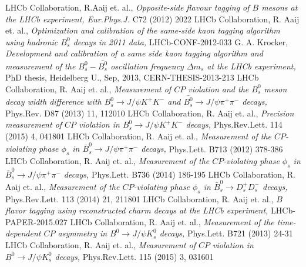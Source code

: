 \documentclass{PoS}
\begin{document}
\begingroup
{}
\begin{thebibliography}{99}
\small{}LHCb Collaboration, R.Aaij et. al., {\it Opposite-side flavour tagging of $B$ mesons at the LHCb experiment, Eur.Phys.J.} C72 (2012) 2022
\small{}LHCb Collaboration, R. Aaij et. al., {\it Optimization and calibration of the same-side kaon \mbox{tagging} algorithm using hadronic $B_s^0$ decays in 2011 data,} LHCb-CONF-2012-033
\small{} G. A. Krocker, {\it Development and calibration of a same side kaon tagging algorithm and measurement of the $B_s^0-\bar{B_s^0}$ oscillation frequency $\Delta m_s$ at the LHCb experiment, } PhD thesis, Heidelberg U., Sep, 2013, CERN-THESIS-2013-213
\small{}LHCb Collaboration, R. Aaij et. al., {\it Measurement of $C\!P$ violation and the $B_s^0$ meson decay width difference with   $B_s^0\to J\!/\!\psi K^+K^-$ and \mbox{$\bar{B_s^0}\to J\!/\!\psi \pi^+\pi^-$} decays, } Phys.Rev. D87 (2013) 11, 112010
\small{}LHCb Collaboration, R. Aaij et. al., {\it Precision measurement of $C\!P$ violation in $B_s^0\to J\!/\!\psi K^+K^-$ decays, } Phys.Rev.Lett. 114 (2015) 4, 041801
\small{} LHCb Collaboration, R. Aaij et. al., {\it Measurement of the $C\!P$-violating phase $\phi_s$ in $\bar{B}_s^0\to J\!/\!\psi \pi^+\pi^-$ decays, } Phys.Lett. B713 (2012) 378-386
\small{} LHCb Collaboration, R. Aaij et. al., {\it Measurement of the $C\!P$-violating phase $\phi_s$ in $\bar{B}_s^0\to J\!/\!\psi \pi^+\pi^-$ decays, } Phys.Lett. B736 (2014) 186-195
\small{} LHCb Collaboration, R. Aaij et. al., {\it Measurement of the $C\!P$-violating phase $\phi_s$ in $\bar{B}_s^0\to D_s^+D_s^-$ decays, } Phys.Rev.Lett. 113 (2014) 21, 211801
\small{} LHCb Collaboration, R. Aaij et. al., {\it $B$ flavor tagging using reconstructed charm decays at the LHCb experiment, } LHCb-PAPER-2015.027
 LHCb Collaboration, R. Aaij et. al., {\it Measurement of the time-dependent $C\!P$ asymmetry in $B^0\to J\!/\!\psi K_s^0$ decays, } Phys.Lett. B721 (2013) 24-31
\small{} LHCb Collaboration, R. Aaij et. al., {\it Measurement of $C\!P$ violation in \mbox{$B^0\to J\!/\!\psi K_s^0$} decays, } Phys.Rev.Lett. 115 (2015) 3, 031601


\end{thebibliography}
\endgroup 
\end{document}
